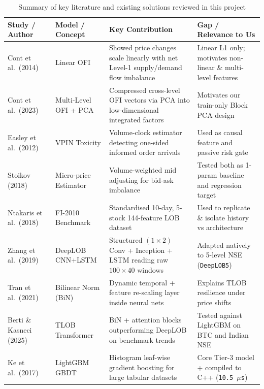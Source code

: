 \documentclass[12pt,a4paper,oneside]{report}
\newcommand{\code}[1]{\texttt{#1}}
\begin{document}
\begin{table}[H]
\centering\scriptsize
\setlength{\tabcolsep}{4pt}
\caption{Summary of key literature and existing solutions reviewed in this project}
\label{tab:lit_review}
\begin{tabularx}{\linewidth}{@{}>{\raggedright\arraybackslash}p{3.0cm}>{\raggedright\arraybackslash}p{2.3cm}>{\raggedright\arraybackslash}X>{\raggedright\arraybackslash}X@{}}
\toprule
\textbf{Study / Author} & \textbf{Model / Concept} & \textbf{Key Contribution} & \textbf{Gap / Relevance to Us} \\
\midrule
Cont et al.\ (2014)~\cite{cont2014} & Linear OFI & Showed price changes scale linearly with net Level-1 supply/demand flow imbalance & Linear L1 only; motivates non-linear \& multi-level features \\
Cont et al.\ (2023)~\cite{cont2023} & Multi-Level OFI + PCA & Compressed cross-level OFI vectors via PCA into low-dimensional integrated factors & Motivates our train-only Block PCA design \\
Easley et al.\ (2012)~\cite{easley2012} & VPIN Toxicity & Volume-clock estimator detecting one-sided informed order arrivals & Used as causal feature and passive risk gate \\
Stoikov (2018)~\cite{stoikov2018} & Micro-price Estimator & Volume-weighted mid adjusting for bid-ask imbalance & Tested both as 1-param baseline and regression target \\
Ntakaris et al.\ (2018)~\cite{ntakaris2018} & FI-2010 Benchmark & Standardised 10-day, 5-stock 144-feature LOB dataset & Used to replicate \& isolate history vs architecture \\
Zhang et al.\ (2019)~\cite{zhang2019} & DeepLOB CNN+LSTM & Structured $(1{\times}2)$ Conv + Inception + LSTM reading raw $100{\times}40$ windows & Adapted natively to 5-level NSE (\code{DeepLOB5}) \\
Tran et al.\ (2021)~\cite{tran2021} & Bilinear Norm (BiN) & Dynamic temporal + feature re-scaling layer inside neural nets & Explains TLOB resilience under price shifts \\
Berti \& Kasneci (2025)~\cite{berti2025} & TLOB Transformer & BiN + attention blocks outperforming DeepLOB on benchmark trends & Tested against LightGBM on BTC and Indian NSE \\
Ke et al.\ (2017)~\cite{ke2017} & LightGBM GBDT & Histogram leaf-wise gradient boosting for large tabular datasets & Core Tier-3 model + compiled to C++ (\code{10.5\,$\mu$s}) \\

\end{tabularx}
\end{table}
\end{document}
